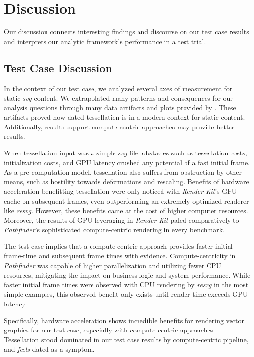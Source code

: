 \chapter{Discussion}\label{sec:discussion}
Our discussion connects interesting findings and discourse on our test case results and interprets our analytic framework's performance in a test trial.

\section{Test Case Discussion}
In the context of our test case, we analyzed several axes of measurement for static \textit{svg} content. We extrapolated many patterns and consequences for our analysis questions through many data artifacts and plots provided by \toolname. These artifacts proved how dated tessellation is in a modern context for static content. Additionally, results support compute-centric approaches may provide better results.\medskip

When tessellation input was a simple \textit{svg} file, obstacles such as tessellation costs, initialization costs, and GPU latency crushed any potential of a fast initial frame. As a pre-computation model, tessellation also suffers from obstruction by other means, such as hostility towards deformations and rescaling. Benefits of hardware acceleration benefitting tessellation were only noticed with \textit{Render-Kit}'s GPU cache on subsequent frames, even outperforming an extremely optimized renderer like \textit{resvg}. However, these benefits came at the cost of higher computer resources. Moreover, the results of GPU leveraging in \textit{Render-Kit} paled comparatively to \textit{Pathfinder}'s sophisticated compute-centric rendering in every benchmark.\medskip

The test case implies that a compute-centric approach provides faster initial frame-time and subsequent frame times with evidence. Compute-centricity in \textit{Pathfinder} was capable of higher parallelization and utilizing fewer CPU resources, mitigating the impact on business logic and system performance. While faster initial frame times were observed with CPU rendering by \textit{resvg} in the most simple examples, this observed benefit only exists until render time exceeds GPU latency.\medskip

Specifically, hardware acceleration shows incredible benefits for rendering vector graphics for our test case, especially with compute-centric approaches. Tessellation stood dominated in our test case results by compute-centric pipeline, and \emph{feels} dated as a symptom.

